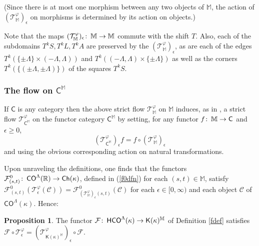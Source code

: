 \documentclass[11pt]{amsart}
\theoremstyle{definition}
\newtheorem{prop}[theorem]{Proposition}
\theoremstyle{remark}
\numberwithin{equation}{section}
\def\co{\colon\thinspace}
\def\ep{\epsilon}
\begin{document}
(Since there is at most one morphism between any two objects of $\mathbb{M}$, the action of $(\mathcal{T}_{\mathbb{M}}^{\varphi})_{\ep}$ on morphisms is determined by its action on objects.)











Note that the maps $(\mathcal{T}_{\mathbb{M}}^{\varphi})_{\ep}\co\mathbb{M}\to\mathbb{M}$ commute with the shift $T$.  Also, each of the subdomains $T^kS, T^kL, T^kA$ are preserved by the $(\mathcal{T}_{\mathbb{M}}^{\varphi})_{\ep}$, as are each of the edges $T^k(\{\pm \Lambda\}\times (-\Lambda,\Lambda))$ and $T^k((-\Lambda,\Lambda)\times\{\pm\Lambda\})$ as well as  the corners $T^k(\{(\pm\Lambda,\pm\Lambda)\})$ of the squares $T^kS$.

\subsubsection{The flow on $\mathsf{C}^{\mathbb{M}}$}

If $\mathsf{C}$ is any category then the above strict flow $\mathcal{T}_{\mathbb{M}}^{\varphi}$ on $\mathbb{M}$ induces, as in \cite[Section 3]{dSMS},  a strict flow $\mathcal{T}_{\mathsf{C}^{\mathbb{M}}}^{\varphi}$ on the functor category $\mathsf{C}^{\mathbb{M}}$ by setting, for any functor $f\co\mathbb{M}\to\mathsf{C}$ and $\ep\geq 0$, \[ (\mathcal{T}_{\mathsf{C}^{\mathbb{M}}}^{\varphi})_{\ep}f=f\circ(\mathcal{T}_{\mathbb{M}}^{\varphi})_{\ep}  \] and using the obvious corresponding action on natural transformations.



Upon unraveling the definitions, one  finds that the functors $\mathcal{F}^{0}_{(s,t)}\co \mathsf{CO}^{\Lambda}(\mathbb{R})\to \mathsf{Ch}(\kappa)$, defined in (\ref{f0dfn}) for each $(s,t)\in\mathbb{M}$, satisfy $\mathcal{F}^{0}_{(s,t)}(\mathcal{T}^{\varphi}_{\ep}(\mathcal{C}))=\mathcal{F}^{0}_{(\mathcal{T}^{\varphi}_{\mathbb{M}})_{\ep}(s,t)}(\mathcal{C})$ for each $\ep\in[0,\infty)$ and each object $\mathcal{C}$ of $\mathsf{CO}^{\Lambda}(\kappa)$.   Hence:

\begin{prop}\label{flowfunctor}
	The functor $\mathcal{F}\co \mathsf{HCO}^{\Lambda}(\kappa)\to \mathsf{K}(\kappa)^{\mathbb{M}}$ of Definition \ref{fdef} satisfies $\mathcal{F}\circ \mathcal{T}^{\varphi}_{\ep}=(\mathcal{T}^{\varphi}_{\mathsf{K}(\kappa)^{\mathbb{M}}})_{\ep}\circ \mathcal{F}$.  
\end{prop}
\end{document}
